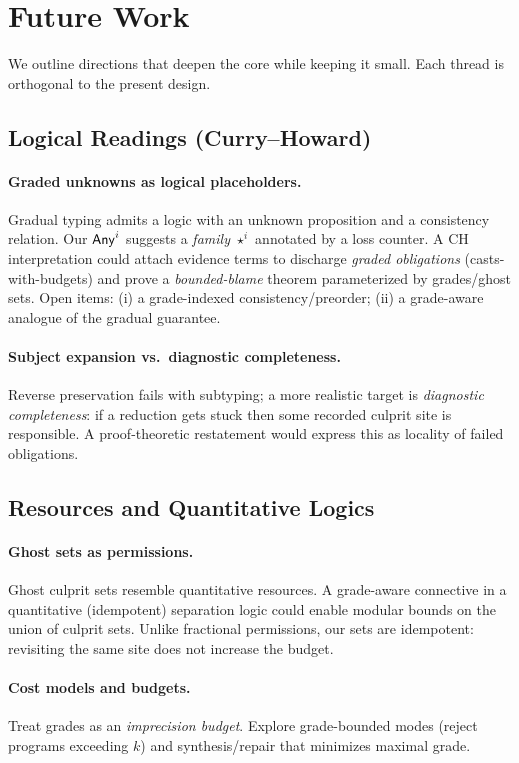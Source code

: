 \section{Future Work}
\label{sec:future}

We outline directions that deepen the core while keeping it small. Each thread is orthogonal to the present design.

\subsection{Logical Readings (Curry--Howard)}
\paragraph{Graded unknowns as logical placeholders.}
Gradual typing admits a logic with an unknown proposition and a consistency relation. Our $\mathsf{Any}^{i}$ suggests a \emph{family} $\star^{i}$ annotated by a loss counter. A CH interpretation could attach evidence terms to discharge \emph{graded obligations} (casts-with-budgets) and prove a \emph{bounded-blame} theorem parameterized by grades/ghost sets. Open items: (i) a grade-indexed consistency/preorder; (ii) a grade-aware analogue of the gradual guarantee.

\paragraph{Subject expansion vs.\ diagnostic completeness.}
Reverse preservation fails with subtyping; a more realistic target is \emph{diagnostic completeness}: if a reduction gets stuck then some recorded culprit site is responsible. A proof-theoretic restatement would express this as locality of failed obligations.

\subsection{Resources and Quantitative Logics}
\paragraph{Ghost sets as permissions.}
Ghost culprit sets resemble quantitative resources. A grade-aware connective in a quantitative (idempotent) separation logic could enable modular bounds on the union of culprit sets. Unlike fractional permissions, our sets are idempotent: revisiting the same site does not increase the budget.

\paragraph{Cost models and budgets.}
Treat grades as an \emph{imprecision budget}. Explore grade-bounded modes (reject programs exceeding $k$) and synthesis/repair that minimizes maximal grade.

